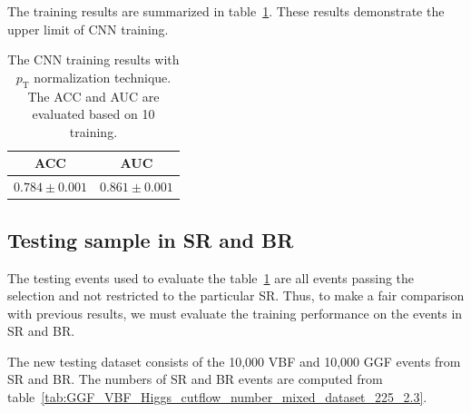 \documentclass[12pt]{article}
\begin{document}
    The training results are summarized in table~\ref{tab:supervised_CNN_training_results}. These results demonstrate the upper limit of CNN training.
    \begin{table}[htpb]
        \centering
        \caption{The CNN training results with $p_{\text{T}}$ normalization technique. The ACC and AUC are evaluated based on 10 training.}
        \label{tab:supervised_CNN_training_results}
        \begin{tabular}{c|c}
             ACC               & AUC               \\ \hline
             $0.784 \pm 0.001$ & $0.861 \pm 0.001$ \\
        \end{tabular}
    \end{table}

    \subsection{Testing sample in SR and BR}%
    \label{sub:testing_sample_in_sr_and_br}
        The testing events used to evaluate the table~\ref{tab:supervised_CNN_training_results} are all events passing the selection and not restricted to the particular SR. Thus, to make a fair comparison with previous results, we must evaluate the training performance on the events in SR and BR.

        The new testing dataset consists of the 10,000 VBF and 10,000 GGF events from SR and BR. The numbers of SR and BR events are computed from table~\ref{tab:GGF_VBF_Higgs_cutflow_number_mixed_dataset_225_2.3}.
\end{document}
